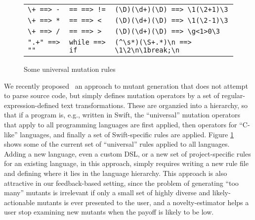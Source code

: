 \begin{figure}
\begin{tabularx}{0.75\textwidth}{XXX}
\verb|\+ ==> -| & \verb|== ==> !=| & \verb|(\D)(\d+)(\D) ==> \1(\2+1)\3|\\
\verb|\+ ==> *| & \verb|== ==> <| & \verb|(\D)(\d+)(\D) ==> \1(\2-1)\3|\\
\verb|\+ ==> /| & \verb|== ==> >| & \verb|(\D)(\d+)(\D) ==> \g<1>0\3|\\
\verb|".+" ==> ""| & \verb|while ==> if| & \verb|(^\s*)(\S+.*)\n ==> \1\2\n\1break;\n|\\
\end{tabularx}
\caption{Some universal mutation rules}
\label{fig:rules}
\end{figure}

We recently proposed~\cite{regexpMut} an approach to mutant generation that does not attempt to parse source code, but simply defines mutation operators by a set of regular-expression-defined text transformations.  These are organzied into a hierarchy, so that if a program is, e.g., written in Swift, the ``universal'' mutation operators that apply to all programming languages are first applied, then operators for ``C-like'' languages, and finally a set of Swift-specific rules are applied.  Figure \ref{fig:rules} shows some of the current set of ``universal'' rules applied to all languages.  Adding a new language, even a custom DSL, or a new set of project-specific rules for an existing language, in this approach, simply requires writing a new rule file and defining where it lies in the language hierarchy.  This approach is also attractive in our feedback-based setting, since the problem of generating ``too many'' mutants is irrelevant if only a small set of highly diverse and likely-actionable mutants is ever presented to the user, and a novelty-estimator helps a user stop examining new mutants when the payoff is likely to be low.

